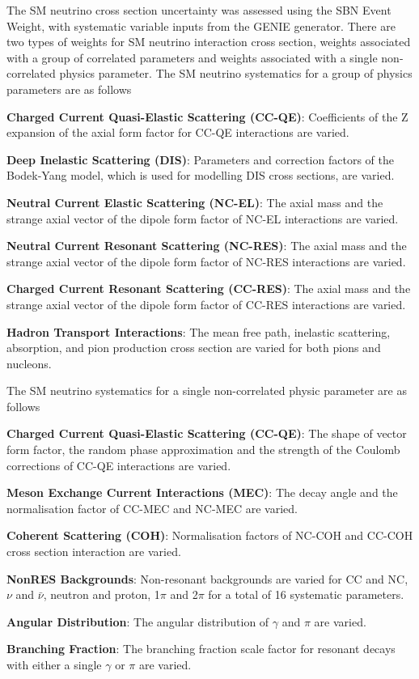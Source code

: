 The SM neutrino cross section uncertainty was assessed using the SBN Event Weight, with systematic variable inputs from the GENIE generator.
There are two types of weights for SM neutrino interaction cross section, weights associated with a group of correlated parameters and weights associated with a single non-correlated physics parameter.
The SM neutrino systematics for a group of physics parameters are as follows
\begin{coloritemize}
\item\textbf{Charged Current Quasi-Elastic Scattering (CC-QE)}: Coefficients of the Z expansion of the axial form factor for CC-QE interactions are varied.
\item\textbf{Deep Inelastic Scattering (DIS)}: Parameters and correction factors of the Bodek-Yang model, which is used for modelling DIS cross sections, are varied. 
\item\textbf{Neutral Current Elastic Scattering (NC-EL)}: The axial mass and the strange axial vector of the dipole form factor of NC-EL interactions are varied.
\item\textbf{Neutral Current Resonant Scattering (NC-RES)}: The axial mass and the strange axial vector of the dipole form factor of NC-RES interactions are varied.
\item\textbf{Charged Current Resonant Scattering (CC-RES)}: The axial mass and the strange axial vector of the dipole form factor of CC-RES interactions are varied.
\item\textbf{Hadron Transport Interactions}: The mean free path, inelastic scattering, absorption, and pion production cross section are varied for both pions and nucleons.
\end{coloritemize}
The SM neutrino systematics for a single non-correlated physic parameter are as follows
\begin{coloritemize}
\item\textbf{Charged Current Quasi-Elastic Scattering (CC-QE)}: The shape of vector form factor, the random phase approximation and the strength of the Coulomb corrections of CC-QE interactions are varied.
\item\textbf{Meson Exchange Current Interactions (MEC)}: The decay angle and the normalisation factor of CC-MEC and NC-MEC are varied.
\item\textbf{Coherent Scattering (COH)}: Normalisation factors of NC-COH and CC-COH cross section interaction are varied.
\item\textbf{NonRES Backgrounds}: Non-resonant backgrounds are varied for CC and NC, $\nu$ and $\bar{\nu}$, neutron and proton, 1$\pi$ and 2$\pi$ for a total of 16 systematic parameters.
\item\textbf{Angular Distribution}: The angular distribution of $\gamma$ and $\pi$ are varied.
\item\textbf{Branching Fraction}: The branching fraction scale factor for resonant  decays with either a single $\gamma$ or $\pi$ are varied.
\end{coloritemize}
